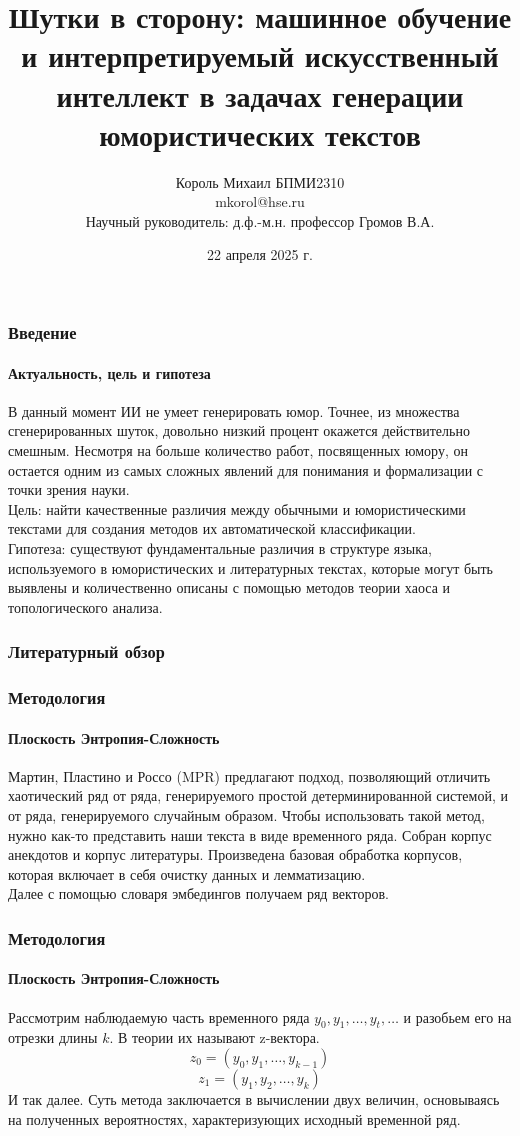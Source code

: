 \documentclass[aspectratio=169]{beamer}
\title[Заголовок]{Шутки в сторону: машинное обучение и интерпретируемый искусственный интеллект в задачах генерации юмористических текстов}
\author[Имя автора]{Король Михаил БПМИ2310 \\ \smallskip \scriptsize mkorol@hse.ru\\{Научный руководитель: д.ф.-м.н. профессор Громов В.А.}}
\institute{Факультет компьютерных наук}
\date{22 апреля 2025 г.}
\begin{document}

\frame[plain]{\titlepage}	%

\begin{frame}
\frametitle{Введение}
\framesubtitle{Актуальность, цель и гипотеза}
	В данный момент ИИ не умеет генерировать юмор. Точнее, из множества сгенерированных шуток, довольно низкий процент окажется действительно смешным. Несмотря на больше количество работ, посвященных юмору, он остается одним из самых сложных явлений для понимания и формализации с точки зрения науки. \\
	Цель: найти качественные различия между обычными и юмористическими текстами для создания методов их автоматической классификации.\\
	Гипотеза: существуют фундаментальные различия в структуре языка, используемого в юмористических и литературных текстах, которые могут быть выявлены и количественно описаны с помощью методов теории хаоса и топологического анализа.
	
\end{frame}

\begin{frame}
\frametitle{Литературный обзор}

\end{frame}

\begin{frame}
\frametitle{Методология}
\framesubtitle{Плоскость Энтропия-Сложность}

Мартин, Пластино и Россо (MPR) предлагают подход, позволяющий отличить хаотический ряд от ряда, генерируемого простой детерминированной системой, и от ряда, генерируемого случайным образом. Чтобы использовать такой метод, нужно как-то представить наши текста в виде временного ряда. Собран корпус анекдотов и корпус литературы. Произведена базовая обработка корпусов, которая включает в себя очистку данных и лемматизацию. \\
Далее с помощью словаря эмбедингов получаем ряд векторов. 
	
\end{frame}

\begin{frame}
\frametitle{Методология}
\framesubtitle{Плоскость Энтропия-Сложность}
	Рассмотрим наблюдаемую часть временного ряда $ y_0, y_1, \dots, y_t, \dots $ и разобьем его на отрезки длины $k$. В теории их называют z-вектора.
	$$ 
	z_0 = (y_0, y_1, \dots, y_{k-1}) 
	$$
	$$
	z_1 = (y_1, y_2, \dots, y_{k}) 
	$$
	И так далее. Суть метода заключается в вычислении двух величин, основываясь на полученных вероятностях, характеризующих исходный временной ряд.

\end{frame}
\end{document}
